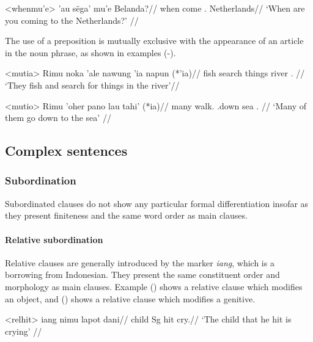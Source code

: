 \documentclass[../hewa_main-subfiles.tex]{subfiles}
\begin{document}
\ex<whenmu'e> %
\begingl %
 'au sëga' mu'e Belanda?//
\glb when \Second{}\Sg{} come \Dir{}.\Dei{} Netherlands//
\glft `When are you coming to the Netherlands?' // 
\endgl
\xe


The use of a preposition is mutually exclusive with the appearance of an article in the noun phrase, as shown in examples (-).

\ex<mutia> %
\begingl %
\gla Rimu noka 'ale nawung 'ia napun (*'ia)//
\glb \Third{}\Pl{} fish search things \Loc{} river \Def{}.\Sg{} //
\glft `They fish and search for things in the river'//
\endgl
\xe
	
\ex<mutio> %
\begingl %
\gla Rimu 'oher pano lau tahi' (*ia)//
\glb \Third{}\Pl{} many walk.\Third{}\Pl{} \Dir{}.down sea \Def{}.\Sg{} //
\glft `Many of them go down to the sea' // 
\endgl
\xe

\subsection{Complex sentences} %

\subsubsection{Subordination}

Subordinated clauses do not show any particular formal differentiation insofar as they present finiteness and the same word order as main clauses.

\paragraph{Relative subordination}

Relative clauses are generally introduced by the marker \textit{iang}, which is a borrowing from Indonesian. They present the same constituent order and morphology as main clauses. Example () shows a relative clause which modifies an object, and () shows a relative clause which modifies a genitive.

\ex<relhit> %
\begingl %
 iang nimu lapot dani//
\glb child \Rel{} \Third{}Sg{} hit cry.\Third{}\Sg{}//
\glft `The child that he hit is crying' // 
\endgl
\xe
\end{document}
